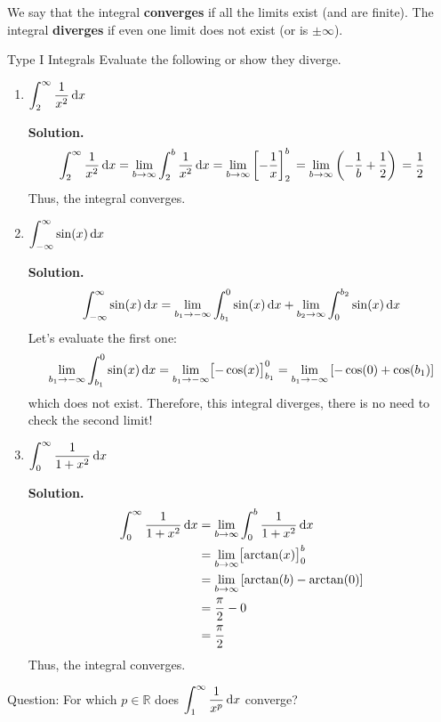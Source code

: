 We say that the integral \textbf{converges} if all the limits exist
(and are finite). The integral \textbf{diverges} if even one limit does
not exist (or is $ \pm\infty $).

\begin{Example}{Type I Integrals}{}
    Evaluate the following or show they diverge.
    \begin{enumerate}[label=(\roman*)]
        \item $ \displaystyle \int_{2}^{\infty} \frac{1}{x^2} \odif{x} $

              \textbf{Solution.}
              \[
                  \int_{2}^{\infty} \frac{1}{x^2} \odif{x}
                  =\lim\limits_{{b} \to {\infty}} \int_{2}^{b} \frac{1}{x^2} \odif{x}       \\
                  = \lim\limits_{{b} \to {\infty}} \left[-\frac{1}{x}  \right]_{2}^b       \\
                  =\lim\limits_{{b} \to {\infty}} \left( -\frac{1}{b} +\frac{1}{2} \right) \\
                  =\frac{1}{2}
              \]
              Thus, the integral converges.
        \item $ \displaystyle \int_{-\infty}^{\infty} \sin(x)\odif{x} $

              \textbf{Solution.}
              \[
                  \int_{-\infty}^{\infty} \sin(x)\odif{x}
                  =\lim\limits_{{b_1} \to {-\infty}} \int_{b_1}^{0} \sin(x)\odif{x}
                  +\lim\limits_{{b_2} \to {\infty}} \int_{0}^{b_2} \sin(x)\odif{x}
              \]
              Let's evaluate the first one:
              \[ \lim\limits_{{b_1} \to {-\infty}}\int_{b_1}^{0} \sin(x)\odif{x}
                  = \lim\limits_{{b_1} \to {-\infty}}\bigl[-\cos(x) \bigr]_{b_1}^0
                  =\lim\limits_{{b_1} \to {-\infty}} \left[-\cos(0)+\cos(b_1)\right] \]
              which does not exist. Therefore, this integral
              diverges, there is no need to check the second limit!
        \item $ \displaystyle \int_{0}^{\infty} \frac{1}{1+x^2}\odif{x} $

              \textbf{Solution.}\begin{align*}
                  \int_{0}^{\infty} \frac{1}{1+x^2}\odif{x}
                   & =\lim\limits_{{b} \to {\infty}} \int_{0}^{b} \frac{1}{1+x^2} \odif{x} \\
                   & = \lim\limits_{{b} \to {\infty}} \bigl[\arctan(x) \bigr]_{0}^b        \\
                   & =\lim\limits_{{b} \to {\infty}} \left[\arctan(b)-\arctan(0) \right]   \\
                   & =\frac{\pi}{2} -0                                                     \\
                   & =\frac{\pi}{2}
              \end{align*}
              Thus, the integral converges.
    \end{enumerate}
\end{Example}
Question: For which $ p\in\mathbb{R} $ does $ \displaystyle \int_{1}^{\infty} \frac{1}{x^p} \odif{x} $
converge?

